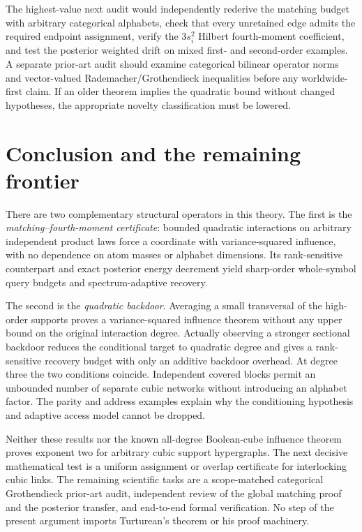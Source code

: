 \documentclass[11pt,letterpaper]{article}
\theoremstyle{definition}
\begin{document}
The highest-value next audit would independently rederive the
matching budget with arbitrary categorical alphabets, check that
every unretained edge admits the required endpoint assignment,
verify the $3s_i^2$ Hilbert fourth-moment coefficient, and test the
posterior weighted drift on mixed first- and second-order examples.
A separate prior-art audit should examine categorical bilinear
operator norms and vector-valued Rademacher/Grothendieck inequalities
before any worldwide-first claim. If an older theorem implies the
quadratic bound without changed hypotheses, the appropriate novelty
classification must be lowered.

\section{Conclusion and the remaining frontier}\label{sec:conclusion}
There are two complementary structural operators in this theory.
The first is the \emph{matching--fourth-moment certificate}: bounded
quadratic interactions on arbitrary independent product laws force a
coordinate with variance-squared influence, with no dependence on
atom masses or alphabet dimensions. Its rank-sensitive counterpart
and exact posterior energy decrement yield sharp-order whole-symbol
query budgets and spectrum-adaptive recovery.

The second is the \emph{quadratic backdoor}. Averaging a small
transversal of the high-order supports proves a variance-squared
influence theorem without any upper bound on the original interaction
degree. Actually observing a stronger sectional backdoor reduces the
conditional target to quadratic degree and gives a rank-sensitive
recovery budget with only an additive backdoor overhead. At degree
three the two conditions coincide. Independent covered blocks permit
an unbounded number of separate cubic networks without introducing
an alphabet factor. The parity and address examples explain why the
conditioning hypothesis and adaptive access model cannot be dropped.

Neither these results nor the known all-degree Boolean-cube
influence theorem proves exponent two for arbitrary cubic support
hypergraphs. The next decisive mathematical test is a uniform
assignment or overlap certificate for interlocking cubic links. The
remaining scientific tasks are a scope-matched categorical
Grothendieck prior-art audit, independent review of the global
matching proof and the posterior transfer, and end-to-end formal
verification. No step of the present argument imports
Turturean's theorem or his proof machinery.
\end{document}
